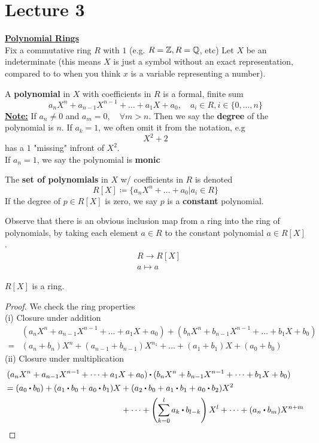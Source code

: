 \documentclass[../Main.tex]{subfiles}
\begin{document}
	\chapter{Lecture 3}
	\underline{\textbf{\Large{Polynomial Rings}}}\\
	Fix a commutative ring $R$ with $1$ (e.g. $R=\mathbb{Z}, R=\mathbb{Q}$, etc)
	Let $X$ be an indeterminate (this means $X$ is just a symbol without an exact representation, compared to to when you think $x$ is a variable representing a number).
	\begin{dfn}[title = Polynomial Ring]
		A \textbf{polynomial} in $X$ with coefficients in $R$ is a formal, finite sum
		\[a_nX^n+a_{n-1}X^{n-1}+\dots+a_1X+a_0, \quad a_i\in R, i\in \{0, \dots, n\}\]
		\textbf{\underline{Note:}} If $a_n\ne 0$ and $a_m=0, \quad \forall m>n$. Then we say the \textbf{degree} of the polynomial is $n$.
		If $a_k=1$, we often omit it from the notation, e.g
		\[X^2+2\]
		has a $1$ "missing" infront of $X^2$.\\
		If $a_n=1$, we say the polynomial is \textbf{monic} 
	\end{dfn}
	\begin{dfn}[title=Set of Polynomials andConstant Polynomial]
		The \textbf{set of polynomials} in $X$ w/ coefficients in $R$ is denoted
		\[R[X] \coloneqq \{a_nX^n+\dots+a_0|a_i \in R\} \]
		If the degree of $p\in R[X]$ is zero, we say $p$ is a \textbf{constant} polynomial.
	\end{dfn}
	Observe that there is an obvious inclusion map from a ring into the ring of polynomials, by taking each element $a\in R$ to the constant polynomial $a\in R[X]$.
	\begin{align*}
		&R \to R[X]\\
		&a\mapsto a
	\end{align*}
	\begin{claim}
		$R[X]$ is a ring.
	\end{claim}
	\begin{proof}We check the ring properties \\
		(i) Closure under addition
		\begin{align*}
		&(a_nX^n+a_{n-1}X^{n-1}+\dots+ a_1X+a_0) + (b_nX^n+b_{n-1}X^{n-1}+\dots+b_1X+b_0) \\
		=& (a_n+b_n)X^n +(a_{n-1}+b_{n-1})X^{n_1}+\dots+(a_1+b_1)X+(a_0+b_0)
		\end{align*}
		(ii) Closure under multiplication
		\begin{align*}
			&(a_nX^n+a_{n-1}X^{n-1}+\dots+ a_1X+a_0) \rdot (b_nX^n+b_{n-1}X^{n-1}+\dots+b_1X+b_0) \\
			& \begin{aligned}=(a_0\rdot b_0)+(a_1\rdot b_0+a_0\rdot b_1)X &+ (a_2\rdot b_0 + a_1\rdot b_1+a_0\rdot b_2)X^2\\
			&+\dots+\left(\sum_{k=0}^{l}a_k\rdot b_{l-k}\right) X^l + \dots + (a_n\rdot b_m)X^{n+m}
			\end{aligned}
		\end{align*}
	\end{proof}
\end{document}
